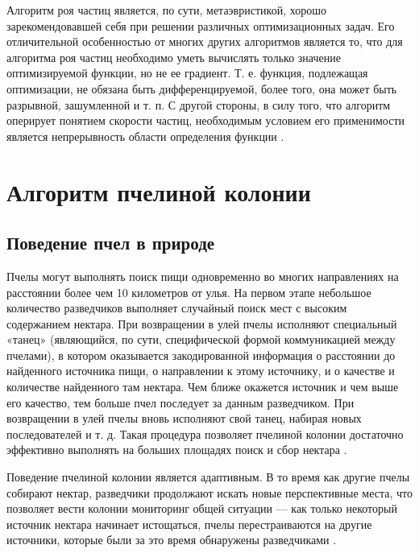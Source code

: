 Алгоритм роя частиц является, по сути, метаэвристикой, хорошо зарекомендовавшей себя при решении различных оптимизационных задач. Его отличительной особенностью от многих других алгоритмов является то, что для алгоритма роя частиц необходимо уметь вычислять только значение оптимизируемой функции, но не ее градиент. Т. е. функция, подлежащая оптимизации, не обязана быть дифференцируемой, более того, она может быть разрывной, зашумленной и т. п. С другой стороны, в силу того, что алгоритм оперирует понятием скорости частиц, необходимым условием его применимости является непрерывность области определения функции \cite{dusan}.

\section{Алгоритм пчелиной колонии}
\subsection{Поведение пчел в природе}
Пчелы могут выполнять поиск пищи одновременно во многих направлениях на расстоянии более чем 10 километров от улья.
На первом этапе небольшое количество разведчиков выполняет случайный поиск мест с высоким содержанием нектара. При возвращении в улей
пчелы исполняют специальный «танец» (являющийся, по сути, специфической формой коммуникацией между пчелами), в котором оказывается 
закодированной информация о расстоянии до найденного источника пищи,
о направлении к этому источнику, и о качестве и количестве найденного
там нектара. Чем ближе окажется источник и чем выше его качество, тем
больше пчел последует за данным разведчиком. При возвращении в улей
пчелы вновь исполняют свой танец, набирая новых последователей и т. д.
Такая процедура позволяет пчелиной колонии достаточно эффективно выполнять на больших площадях поиск и сбор нектара \cite{ershov1}.  



Поведение пчелиной колонии является адаптивным. В то время как другие пчелы собирают нектар, разведчики продолжают искать новые перспективные места, что позволяет вести колонии мониторинг общей ситуации ---
как только некоторый источник нектара начинает истощаться, пчелы перестраиваются на другие источники, которые были за это время обнаружены
разведчиками \cite{leonov}. \newpage

